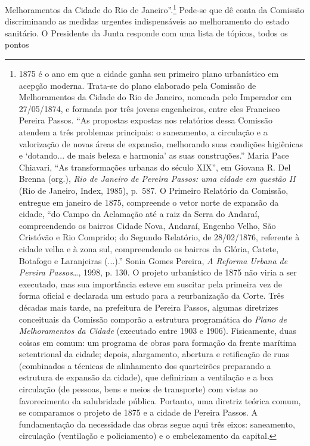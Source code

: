 Melhoramentos da Cidade do Rio de Janeiro''.\footnote{1875 é o ano em
  que a cidade ganha seu primeiro plano urbanístico em acepção moderna.
  Trata-se do plano elaborado pela Comissão de Melhoramentos da Cidade
  do Rio de Janeiro, nomeada pelo Imperador em 27/05/1874, e formada por
  três jovens engenheiros, entre eles Francisco Pereira Passos. ``As
  propostas expostas nos relatórios dessa Comissão atendem a três
  problemas principais: o saneamento, a circulação e a valorização de
  novas áreas de expansão, melhorando suas condições higiênicas e
  `dotando... de mais beleza e harmonia' as suas construções.'' Maria
  Pace Chiavari, ``As transformações urbanas do século XIX'', em Giovana
  R. Del Brenna (org.), \emph{Rio de Janeiro de Pereira Passos: uma
  cidade em questão II} (Rio de Janeiro, Index, 1985), p.~587. O
  Primeiro Relatório da Comissão, entregue em janeiro de 1875,
  compreende o vetor norte de expansão da cidade, ``do Campo da
  Aclamação até a raiz da Serra do Andaraí, compreendendo os bairros
  Cidade Nova, Andaraí, Engenho Velho, São Cristóvão e Rio Comprido; do
  Segundo Relatório, de 28/02/1876, referente à cidade velha e à zona
  sul, compreendendo os bairros da Glória, Catete, Botafogo e
  Laranjeiras (...).'' Sonia Gomes Pereira, \emph{A Reforma Urbana de
  Pereira Passos}\ldots{}, 1998, p. 130. O projeto urbanístico de 1875
  não viria a ser executado, mas sua importância esteve em suscitar pela
  primeira vez de forma oficial e declarada um estudo para a
  reurbanização da Corte. Três décadas mais tarde, na prefeitura de
  Pereira Passos, algumas diretrizes conceituais da Comissão comporão a
  estrutura programática do \emph{Plano de Melhoramentos da Cidade}
  (executado entre 1903 e 1906). Fisicamente, duas coisas em comum: um
  programa de obras para formação da frente marítima setentrional da
  cidade; depois, alargamento, abertura e retificação de ruas
  (combinados a técnicas de alinhamento dos quarteirões preparando a
  estrutura de expansão da cidade), que definiriam a ventilação e a boa
  circulação (de pessoas, bens e meios de transporte) com vistas ao
  favorecimento da salubridade pública. Portanto, uma diretriz teórica
  comum, se comparamos o projeto de 1875 e a cidade de Pereira Passos. A
  fundamentação da necessidade das obras segue aqui três eixos:
  saneamento, circulação (ventilação e policiamento) e o embelezamento
  da capital.} Pede-se que dê conta da Comissão discriminando as medidas
urgentes indispensáveis ao melhoramento do estado sanitário. O
Presidente da Junta responde com uma lista de tópicos, todos os pontos
